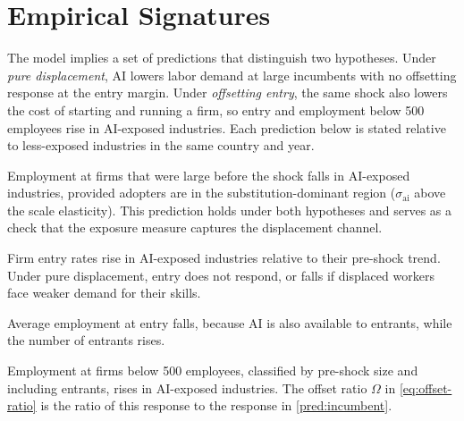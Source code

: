 \section{Empirical Signatures}\label{sec:signatures}


The model implies a set of predictions that distinguish two hypotheses.
Under \emph{pure displacement}, AI lowers labor demand at large incumbents with no offsetting response at the entry margin.
Under \emph{offsetting entry}, the same shock also lowers the cost of starting and running a firm, so entry and employment below 500 employees rise in AI-exposed industries.
Each prediction below is stated relative to less-exposed industries in the same country and year.

\begin{prediction}\label{pred:incumbent}
Employment at firms that were large before the shock falls in AI-exposed industries, provided adopters are in the substitution-dominant region ($\sigma_{\text{ai}}$ above the scale elasticity).
This prediction holds under both hypotheses and serves as a check that the exposure measure captures the displacement channel.
\end{prediction}

\begin{prediction}[Entry]\label{pred:entry}
Firm entry rates rise in AI-exposed industries relative to their pre-shock trend.
Under pure displacement, entry does not respond, or falls if displaced workers face weaker demand for their skills.
\end{prediction}

\begin{prediction}\label{pred:entrant-size}
Average employment at entry falls, because AI is also available to entrants, while the number of entrants rises.
\end{prediction}

\begin{prediction}\label{pred:band}
Employment at firms below 500 employees, classified by pre-shock size and including entrants, rises in AI-exposed industries.
The offset ratio $\Omega$ in \cref{eq:offset-ratio} is the ratio of this response to the response in \cref{pred:incumbent}.
\end{prediction}

